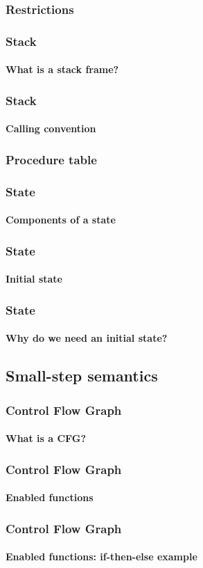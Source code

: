\begin{frame}
\frametitle{Restrictions}
\framesubtitle{}


\end{frame}


\begin{frame}
\frametitle{Stack}
\framesubtitle{What is a stack frame?}


\end{frame}


\begin{frame}
\frametitle{Stack}
\framesubtitle{Calling convention}


\end{frame}


\begin{frame}
\frametitle{Procedure table}
\framesubtitle{}


\end{frame}


\begin{frame}
\frametitle{State}
\framesubtitle{Components of a state}


\end{frame}


\begin{frame}
\frametitle{State}
\framesubtitle{Initial state}


\end{frame}


\begin{frame}
\frametitle{State}
\framesubtitle{Why do we need an initial state?}


\end{frame}


\subsection{Small-step semantics}


\begin{frame}
\frametitle{Control Flow Graph}
\framesubtitle{What is a CFG?}


\end{frame}


\begin{frame}
\frametitle{Control Flow Graph}
\framesubtitle{Enabled functions}


\end{frame}


\begin{frame}
\frametitle{Control Flow Graph}
\framesubtitle{Enabled functions: if-then-else example}


\end{frame}


